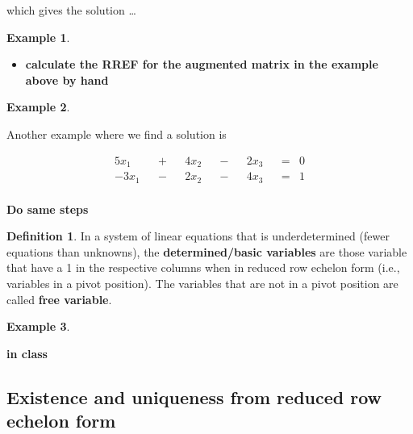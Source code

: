 \documentclass[
]{book}
\providecommand{\tightlist}{%
  \setlength{\itemsep}{0pt}\setlength{\parskip}{0pt}}
\theoremstyle{definition}
\newtheorem{definition}{Definition}[chapter]
\theoremstyle{definition}
\newtheorem{example}{Example}[chapter]
\theoremstyle{definition}
\theoremstyle{remark}
\begin{document}
which gives the solution \ldots{}

\begin{example}
\protect\hypertarget{exm:unlabeled-div-63}{}\label{exm:unlabeled-div-63}

\begin{itemize}
\tightlist
\item
  \textbf{calculate the RREF for the augmented matrix in the example above by hand}
\end{itemize}

\end{example}

\begin{example}
\protect\hypertarget{exm:unlabeled-div-64}{}\label{exm:unlabeled-div-64}

Another example where we find a solution is

\[
\begin{aligned}
5 x_1 && + && 4 x_2 && - && 2 x_3 && = & 0 \\
-3 x_1 && - && 2 x_2 && - && 4 x_3 && = & 1 \\
\end{aligned}
\]

\textbf{Do same steps}

\end{example}

\begin{definition}
\protect\hypertarget{def:unnamed-chunk-64}{}{\label{def:unnamed-chunk-64} }In a system of linear equations that is underdetermined (fewer equations than unknowns), the \textbf{determined/basic variables} are those variable that have a 1 in the respective columns when in reduced row echelon form (i.e., variables in a pivot position). The variables that are not in a pivot position are called \textbf{free variable}.
\end{definition}

\begin{example}
\protect\hypertarget{exm:unlabeled-div-65}{}\label{exm:unlabeled-div-65}

\textbf{in class}

\end{example}

\hypertarget{existence-and-uniqueness-from-reduced-row-echelon-form}{%
\subsection{Existence and uniqueness from reduced row echelon form}\label{existence-and-uniqueness-from-reduced-row-echelon-form}}
\end{document}
